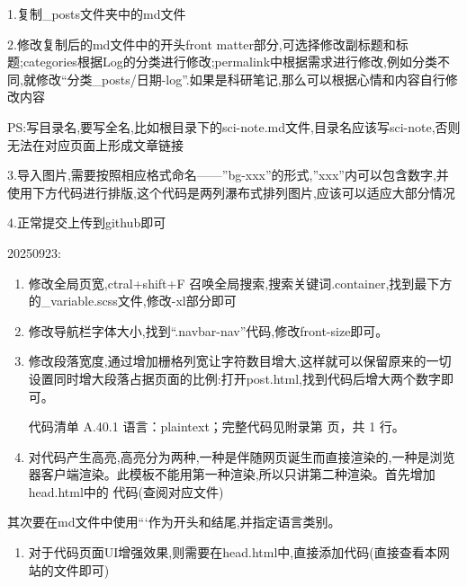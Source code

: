 \documentclass[lang=cn,scheme=chinese,color=blue,device=normal,toc=onecol,math=cm]{elegantbook}
\begin{document}
1.复制\_\allowbreak{}posts文件夹中的md文件\par


2.修改复制后的md文件中的开头front matter部分,可选择修改副标题和标题;categories根据Log的分类进行修改;permalink中根据需求进行修改,例如分类不同,就修改“分类\_\allowbreak{}posts/\allowbreak{}日期-log”.如果是科研笔记,那么可以根据心情和内容自行修改内容\par


PS:写目录名,要写全名,比如根目录下的sci-note.md文件,目录名应该写sci-note,否则无法在对应页面上形成文章链接\par


3.导入图片,需要按照相应格式命名——”bg-xxx”的形式,”xxx”内可以包含数字,并使用下方代码进行排版,这个代码是两列瀑布式排列图片,应该可以适应大部分情况\par


4.正常提交上传到github即可\par


20250923:\par


\begin{enumerate}
\item 修改全局页宽,ctral+shift+F 召唤全局搜索,搜索关键词.container,找到最下方的\_\allowbreak{}variable.scss文件,修改-xl部分即可
\item 修改导航栏字体大小,找到“.navbar-nav”代码,修改front-size即可。
\item 修改段落宽度,通过增加栅格列宽让字符数目增大,这样就可以保留原来的一切设置同时增大段落占据页面的比例:打开post.html,找到代码后增大两个数字即可。\par
 
\begin{codeindexbox}{代码清单 A.40.1}
语言：plaintext；完整代码见附录第 \pageref{code:40:1} 页，共 1 行。
\end{codeindexbox}
\item 对代码产生高亮,高亮分为两种,一种是伴随网页诞生而直接渲染的,一种是浏览器客户端渲染。此模板不能用第一种渲染,所以只讲第二种渲染。首先增加head.html中的 代码(查阅对应文件)
\end{enumerate}


其次要在md文件中使用```作为开头和结尾,并指定语言类别。\par


\begin{enumerate}
\item 对于代码页面UI增强效果,则需要在head.html中,直接添加代码(直接查看本网站的文件即可)
\end{enumerate}
\end{document}
